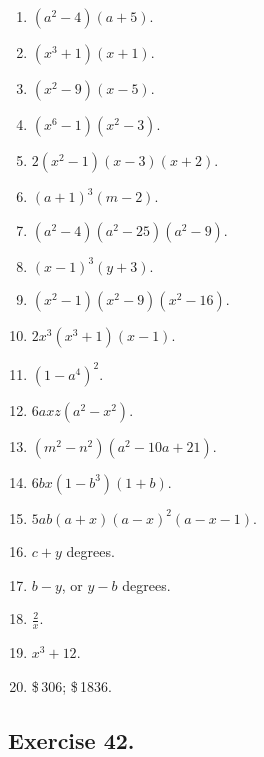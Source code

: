 \documentclass{book}
\begin{document}
\begin{enumerate}
\item $\left(a^2-4\right)\left(a+5\right)$.

\item $\left(x^3+1\right)\left(x+1\right)$.

\item $\left(x^2-9\right)\left(x-5\right)$.

\item $\left(x^6-1\right)\left(x^2-3\right)$.

\item $2\left(x^2-1\right)\left(x-3\right)\left(x+2\right)$.

\item $\left(a+1\right)^3\left(m-2\right)$.

\item $\left(a^2-4\right)\left(a^2-25\right)\left(a^2-9\right)$.

\item $\left(x-1\right)^3\left(y+3\right)$.

\item $\left(x^2-1\right)\left(x^2-9\right)\left(x^2-16\right)$.

\item $2x^3\left(x^3+1\right)\left(x-1\right)$.

\item $\left(1-a^4\right)^2$.

\item $6axz\left(a^2 - x^2\right)$.

\item $\left(m^2-n^2\right)\left(a^2-10a+21\right)$.

\item $6bx\left(1-b^3\right)\left(1+b\right)$.

\item $5ab\left(a+x\right)\left(a-x\right)^2\left(a-x-1\right)$.

\item $c + y$ degrees.

\item $b - y$, or $y - b$ degrees.

\item $\frac{2}{x}$.

\item $x^3 + 12$.

\item \$\,306; \$\,1836.
\end{enumerate}

\subsection*{Exercise 42.}
\end{document}
